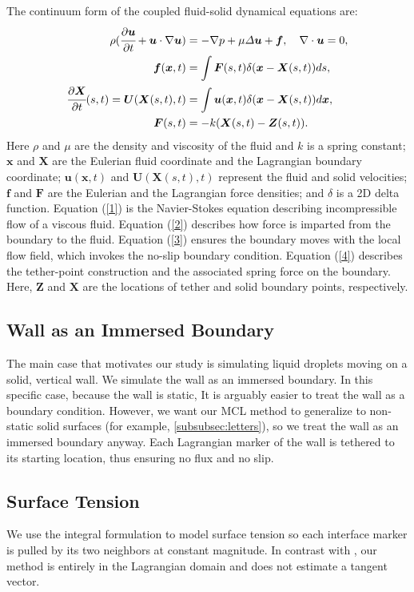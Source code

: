 \documentclass{jfm}
\begin{document}
The continuum form of the coupled fluid-solid dynamical equations are:
\begin{align}
\rho(\cfrac{\partial\bm{u}}{\partial t}+\bm{u}\cdot\nabla\bm{u}) & =-\nabla p+\mu\varDelta\bm{u}+\bm{f},\quad
\nabla\cdot\bm{u}=0, \label{1}\\
\bm{f}(\bm{x},t) & =\int\bm{F}(s,t)\delta(\bm{x}-\bm{X}(s,t))ds, \label{2}\\
\cfrac{\partial\bm{X}}{\partial t}(s,t)=\bm{U}(\bm{X}(s,t),t) & =\int\bm{u}(\bm{x},t)\delta(\bm{x}-\bm{X}(s,t))d\bm{x}, \label{3}\\
\bm{F}(s,t) & =-k(\bm{X}(s,t)-\bm{Z}(s,t)). \label{4}
\end{align}
Here $\rho$ and $\mu$ are the density and viscosity of the fluid and $k$ is a spring constant; $\boldsymbol{x}$ and $\boldsymbol{X}$ are the Eulerian fluid coordinate and the Lagrangian boundary coordinate; $\boldsymbol{u}(\boldsymbol{x},t)$ and $\boldsymbol{U}(\boldsymbol{X}(s,t),t)$ represent the fluid and solid velocities; $\boldsymbol{f}$ and $\boldsymbol{F}$ are the Eulerian and the Lagrangian force densities; and $\delta$ is a 2D delta function. Equation (\ref{1}) is the Navier-Stokes equation describing incompressible flow of a viscous fluid. Equation (\ref{2}) describes how force is imparted from the boundary to the fluid. Equation (\ref{3}) ensures the boundary moves with the local flow field, which invokes the no-slip boundary condition. Equation (\ref{4}) describes the tether-point construction and the associated spring force on the boundary. Here, $\boldsymbol{Z}$ and $\boldsymbol{X}$ are the locations of tether and solid boundary points, respectively.

\subsection{Wall as an Immersed Boundary} \label{subsec:wall}
The main case that motivates our study is simulating liquid droplets moving on a solid, vertical wall. We simulate the wall as an immersed boundary. In this specific case, because the wall is static, It is arguably easier to treat the wall as a boundary condition. However, we want our MCL method to generalize to non-static solid surfaces (for example, \ref{subsubsec:letters}), so we treat the wall as an immersed boundary anyway. Each Lagrangian marker of the wall is tethered to its starting location, thus ensuring no flux and no slip. 

\subsection{Surface Tension}
We use the integral formulation to model surface tension \cite{surface_tension_review} so each interface marker is pulled by its two neighbors at constant magnitude. In contrast with \cite{surface_tension_still_tangent_applied_to_segment}, our method is entirely in the Lagrangian domain and does not estimate a tangent vector. 
\end{document}
